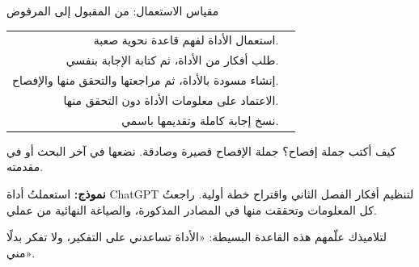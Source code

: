 \documentclass[aspectratio=169, 11pt, xcolor={table}]{beamer}
\begin{document}
\begin{frame}{مقياس الاستعمال: من المقبول إلى المرفوض}
    \vspace*{-2mm}
    \begin{center}
    \end{center}
    \small\renewcommand{\arraystretch}{1.15}
    \begin{tabularx}{\textwidth}{|R|>{\centering\arraybackslash}p{3.2cm}|}
        \hline
         &  \\ \hline
        استعمال الأداة لفهم قاعدة نحوية صعبة.
            &  \\ \hline
        طلب أفكار من الأداة، ثم كتابة الإجابة بنفسي.
            &  \\ \hline
        إنشاء مسودة بالأداة، ثم مراجعتها والتحقق منها والإفصاح.
            &  \\ \hline
        الاعتماد على معلومات الأداة دون التحقق منها.
            &  \\ \hline
        نسخ إجابة كاملة وتقديمها باسمي.
            &  \\ \hline
    \end{tabularx}
\end{frame}

\begin{frame}{كيف أكتب جملة إفصاح؟}
    جملة الإفصاح قصيرة وصادقة. نضعها في آخر البحث أو في مقدمته.
    \begin{amr}[brandTeal]
        \textbf{نموذج:} استعملتُ أداة \textenglish{ChatGPT} لتنظيم أفكار الفصل الثاني
        واقتراح خطة أولية. راجعتُ كل المعلومات وتحققت منها في المصادر المذكورة،
        والصياغة النهائية من عملي.
    \end{amr}
    \begin{tbox}{\faChalkboardTeacher\quad لتلاميذك}
        علّمهم هذه القاعدة البسيطة:
        «الأداة تساعدني على التفكير، ولا تفكر بدلًا مني».
    \end{tbox}
\end{frame}
\end{document}
